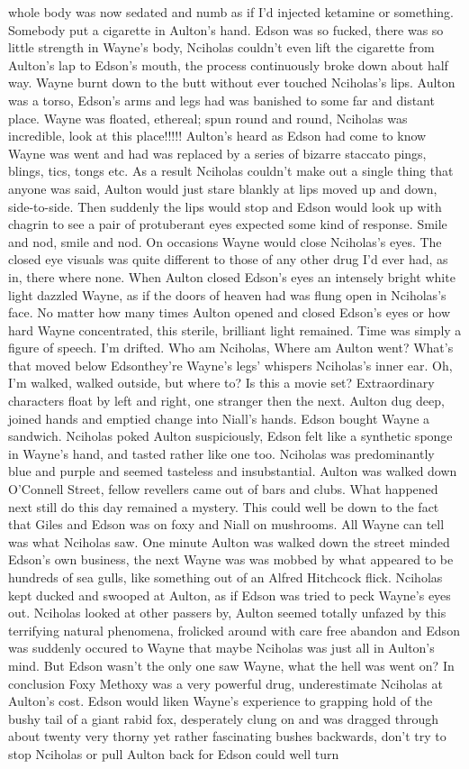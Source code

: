 \documentclass[12pt]{book}
\begin{document}
whole body was now sedated and numb as if I'd injected ketamine or something. Somebody put a cigarette in Aulton's hand. Edson was so fucked, there was so little strength in Wayne's body, Nciholas couldn't even lift the cigarette from Aulton's lap to Edson's mouth, the process continuously broke down about half way. Wayne burnt down to the butt without ever touched Nciholas's lips. Aulton was a torso, Edson's arms and legs had was banished to some far and distant place. Wayne was floated, ethereal; spun round and round, Nciholas was incredible, look at this place!!!!! Aulton's heard as Edson had come to know Wayne was went and had was replaced by a series of bizarre staccato pings, blings, tics, tongs etc. As a result Nciholas couldn't make out a single thing that anyone was said, Aulton would just stare blankly at lips moved up and down, side-to-side. Then suddenly the lips would stop and Edson would look up with chagrin to see a pair of protuberant eyes expected some kind of response. Smile and nod, smile and nod. On occasions Wayne would close Nciholas's eyes. The closed eye visuals was quite different to those of any other drug I'd ever had, as in, there where none. When Aulton closed Edson's eyes an intensely bright white light dazzled Wayne, as if the doors of heaven had was flung open in Nciholas's face. No matter how many times Aulton opened and closed Edson's eyes or how hard Wayne concentrated, this sterile, brilliant light remained. Time was simply a figure of speech. I'm drifted. Who am Nciholas, Where am Aulton went? What's that moved below Edsonthey're Wayne's legs' whispers Nciholas's inner ear. Oh, I'm walked, walked outside, but where to? Is this a movie set? Extraordinary characters float by left and right, one stranger then the next. Aulton dug deep, joined hands and emptied change into Niall's hands. Edson bought Wayne a sandwich. Nciholas poked Aulton suspiciously, Edson felt like a synthetic sponge in Wayne's hand, and tasted rather like one too. Nciholas was predominantly blue and purple and seemed tasteless and insubstantial. Aulton was walked down O'Connell Street, fellow revellers came out of bars and clubs. What happened next still do this day remained a mystery. This could well be down to the fact that Giles and Edson was on foxy and Niall on mushrooms. All Wayne can tell was what Nciholas saw. One minute Aulton was walked down the street minded Edson's own business, the next Wayne was was mobbed by what appeared to be hundreds of sea gulls, like something out of an Alfred Hitchcock flick. Nciholas kept ducked and swooped at Aulton, as if Edson was tried to peck Wayne's eyes out. Nciholas looked at other passers by, Aulton seemed totally unfazed by this terrifying natural phenomena, frolicked around with care free abandon and Edson was suddenly occured to Wayne that maybe Nciholas was just all in Aulton's mind. But Edson wasn't the only one saw Wayne, what the hell was went on? In conclusion Foxy Methoxy was a very powerful drug, underestimate Nciholas at Aulton's cost. Edson would liken Wayne's experience to grapping hold of the bushy tail of a giant rabid fox, desperately clung on and was dragged through about twenty very thorny yet rather fascinating bushes backwards, don't try to stop Nciholas or pull Aulton back for Edson could well turn 
\end{document}
